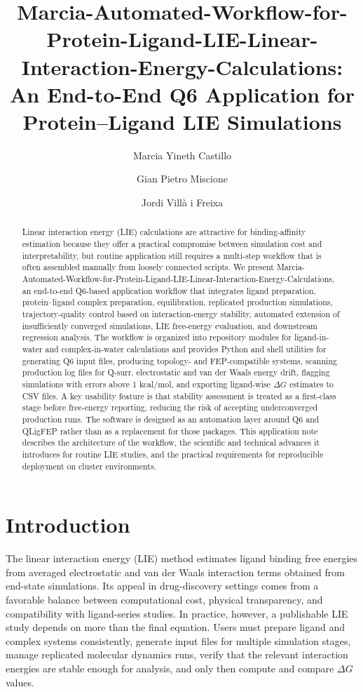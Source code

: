 \documentclass[journal=jcisd8,manuscript=article]{achemso}
\author{Marcia Yineth Castillo}
\affiliation{Departamento de Qu\'imica, Universidad de los Andes, Bogot\'a 111711, Colombia}
\author{Gian Pietro Miscione}
\affiliation{Departamento de Qu\'imica, Universidad de los Andes, Bogot\'a 111711, Colombia}
\author{Jordi Vill\`a i Freixa}
\affiliation{Universitat de Vic -- Universitat Central de Catalunya, Vic, Barcelona 08500, Spain}
\title{Marcia-Automated-Workflow-for-Protein-Ligand-LIE-Linear-Interaction-Energy-Calculations: An End-to-End Q6 Application for Protein--Ligand LIE Simulations}
\begin{document}
\begin{abstract}
Linear interaction energy (LIE) calculations are attractive for binding-affinity estimation because they offer a practical compromise between simulation cost and interpretability, but routine application still requires a multi-step workflow that is often assembled manually from loosely connected scripts. We present Marcia-Automated-Workflow-for-Protein-Ligand-LIE-Linear-Interaction-Energy-Calculations, an end-to-end Q6-based application workflow that integrates ligand preparation, protein--ligand complex preparation, equilibration, replicated production simulations, trajectory-quality control based on interaction-energy stability, automated extension of insufficiently converged simulations, LIE free-energy evaluation, and downstream regression analysis. The workflow is organized into repository modules for ligand-in-water and complex-in-water calculations and provides Python and shell utilities for generating Q6 input files, producing topology- and FEP-compatible systems, scanning production log files for Q-surr. electrostatic and van der Waals energy drift, flagging simulations with errors above 1 kcal/mol, and exporting ligand-wise \(\Delta G\) estimates to CSV files. A key usability feature is that stability assessment is treated as a first-class stage before free-energy reporting, reducing the risk of accepting underconverged production runs. The software is designed as an automation layer around Q6 and QLigFEP rather than as a replacement for those packages. This application note describes the architecture of the workflow, the scientific and technical advances it introduces for routine LIE studies, and the practical requirements for reproducible deployment on cluster environments.
\end{abstract}

\section{Introduction}

The linear interaction energy (LIE) method estimates ligand binding free energies from averaged electrostatic and van der Waals interaction terms obtained from end-state simulations.\cite{aqvist2001lie,gutierrez2012lie} Its appeal in drug-discovery settings comes from a favorable balance between computational cost, physical transparency, and compatibility with ligand-series studies. In practice, however, a publishable LIE study depends on more than the final equation. Users must prepare ligand and complex systems consistently, generate input files for multiple simulation stages, manage replicated molecular dynamics runs, verify that the relevant interaction energies are stable enough for analysis, and only then compute and compare \(\Delta G\) values.
\end{document}
